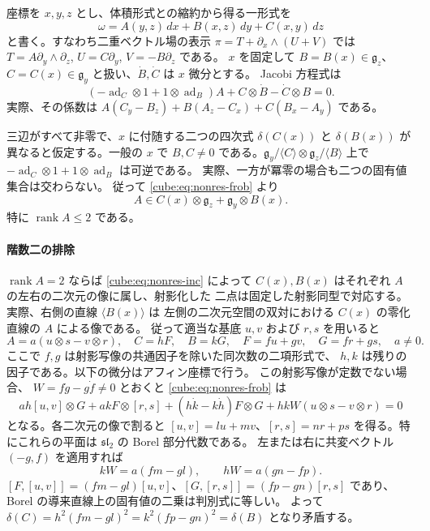 座標を $x,y,z$ とし、体積形式との縮約から得る一形式を
\[
 \omega=A(y,z)\,dx+B(x,z)\,dy+C(x,y)\,dz
\]
と書く。すなわち二重ベクトル場の表示
$\pi=T+\partial_x\wedge(U+V)$ では
$T=A\partial_y\wedge\partial_z$, $U=C\partial_y$, $V=-B\partial_z$ である。
$x$ を固定して $B=B(x)\in\mathfrak g_z$、$C=C(x)\in\mathfrak g_y$
と扱い、$\dot B,\dot C$ は $x$ 微分とする。
Jacobi 方程式は
\begin{equation}\label{cube:eq:nonres-frob}
 (-\operatorname{ad}_C\otimes1+1\otimes\operatorname{ad}_B)A
  + C\otimes\dot B-\dot C\otimes B=0.
\end{equation}
実際、その係数は $A(C_y-B_z)+B(A_z-C_x)+C(B_x-A_y)$ である。

三辺がすべて非零で、$x$ に付随する二つの四次式
$\delta(C(x))$ と $\delta(B(x))$ が異なると仮定する。一般の $x$ で
$B,C\ne0$ である。$\mathfrak g_y/\langle C\rangle\otimes
\mathfrak g_z/\langle B\rangle$ 上で
$-\operatorname{ad}_C\otimes1+1\otimes\operatorname{ad}_B$ は可逆である。
実際、一方が冪零の場合も二つの固有値集合は交わらない。
従って \eqref{cube:eq:nonres-frob} より
\begin{equation}\label{cube:eq:nonres-inc}
 A\in C(x)\otimes\mathfrak g_z+\mathfrak g_y\otimes B(x).
\end{equation}
特に $\operatorname{rank}A\le2$ である。

\paragraph{階数二の排除}
$\operatorname{rank}A=2$ ならば \eqref{cube:eq:nonres-inc} によって
$C(x),B(x)$ はそれぞれ $A$ の左右の二次元の像に属し、射影化した
二点は固定した射影同型で対応する。実際、右側の直線 $\langle B(x)\rangle$ は
左側の二次元空間の双対における $C(x)$ の零化直線の $A$ による像である。
従って適当な基底 $u,v$ および $r,s$ を用いると
\[
 A=a(u\otimes s-v\otimes r),\quad
 C=hF,\quad B=kG,\quad F=fu+gv,\quad G=fr+gs,\quad a\ne0.
\]
ここで $f,g$ は射影写像の共通因子を除いた同次数の二項形式で、
$h,k$ は残りの因子である。以下の微分はアフィン座標で行う。
この射影写像が定数でない場合、
$W=f\dot g-g\dot f\ne0$ とおくと \eqref{cube:eq:nonres-frob} は
\[
 ah[u,v]\otimes G+akF\otimes[r,s]
 +(h\dot k-k\dot h)F\otimes G
 +hkW(u\otimes s-v\otimes r)=0
\]
となる。各二次元の像で割ると $[u,v]=l u+m v$、$[r,s]=n r+p s$
を得る。特にこれらの平面は $\mathfrak{sl}_2$ の Borel 部分代数である。
左または右に共変ベクトル $(-g,f)$ を適用すれば
\[
 kW=a(fm-gl),\qquad hW=a(gn-fp).
\]
$[F,[u,v]]=(fm-gl)[u,v]$、$[G,[r,s]]=(fp-gn)[r,s]$ であり、
Borel の導来直線上の固有値の二乗は判別式に等しい。
よって $\delta(C)=h^2(fm-gl)^2=k^2(fp-gn)^2=\delta(B)$ となり矛盾する。


